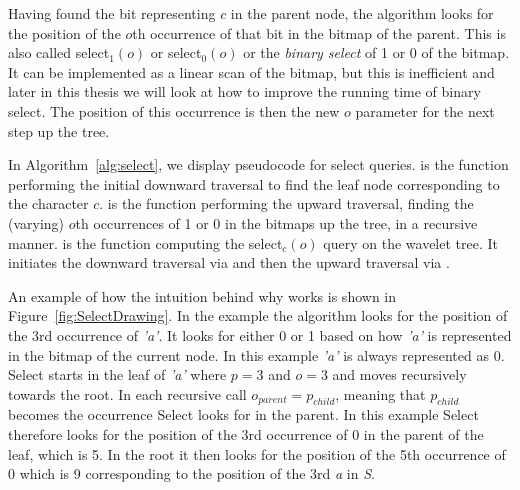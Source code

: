 Having found the bit representing $c$ in the parent node, the algorithm looks for the position of the $o$th occurrence of that bit in the bitmap of the parent.
This is also called select$_1(o)$ or select$_0(o)$ or the \textit{binary select} of 1 or 0 of the bitmap.
It can be implemented as a linear scan of the bitmap, but this is inefficient and later in this thesis we will look at how to improve the running time of binary select.
The position of this occurrence is then the new $o$ parameter for the next step up the tree.

In Algorithm~\ref{alg:select}, we display pseudocode for select queries.
 is the function performing the initial downward traversal to find the leaf node corresponding to the character $c$.
 is the function performing the upward traversal, finding the (varying) $o$th occurrences of 1 or 0 in the bitmaps up the tree, in a recursive manner.
 is the function computing the select$_{c}(o)$ query on the wavelet tree.
It initiates the downward traversal via  and then the upward traversal via .

An example of how the intuition behind why  works is shown in Figure~\ref{fig:SelectDrawing}.
In the example the algorithm looks for the position of the 3rd occurrence of \textit{'a'}.
It looks for either 0 or 1 based on how \textit{'a'} is represented in the bitmap of the current node. In this example \textit{'a'} is always represented as 0.
Select starts in the leaf of \textit{'a'} where $p = 3$ and $o = 3$ and moves recursively towards the root. In each recursive call $o_{parent} = p_{child}$, meaning that $p_{child}$ becomes the occurrence Select looks for in the parent. In this example Select therefore looks for the position of the 3rd occurrence of 0 in the parent of the leaf, which is 5. In the root it then looks for the position of the 5th occurrence of 0 which is 9 corresponding to the position of the 3rd \textit{a} in \textit{S}.

